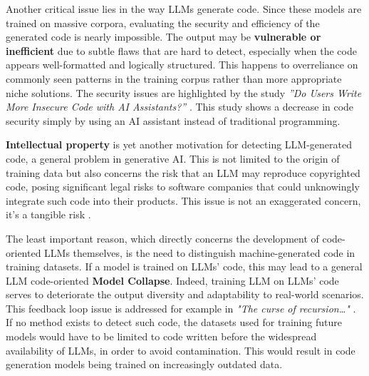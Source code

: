 \vspace{1\baselineskip}
\noindent

Another critical issue lies in the way LLMs generate code. 
Since these models are trained on massive corpora, 
evaluating the security and efficiency of the generated 
code is nearly impossible. The output may be 
\textbf{vulnerable or inefficient} 
due to subtle flaws that are hard to detect, especially 
when the code appears well-formatted and logically 
structured. 
This happens to overreliance on 
commonly seen patterns in the training corpus rather 
than more appropriate niche solutions.
The security issues are highlighted by the study
\textit{”Do Users Write More Insecure Code with AI Assistants?”} 
\cite{perry2022users}. This study shows a decrease in
code security simply by using an AI assistant instead of
traditional programming.


\vspace{1\baselineskip}
\noindent

\textbf{Intellectual property} is yet another motivation 
for detecting LLM-generated code, a general problem 
in generative AI. This is not limited to the origin 
of training data but also concerns the risk that an 
LLM may reproduce copyrighted code, posing 
significant legal risks to software companies 
that could unknowingly integrate such code into 
their products.
This issue is not an exaggerated concern, 
it's a tangible risk \cite{DoeVGitHub2024}.


\vspace{1\baselineskip}
\noindent

The least important reason, 
which directly 
concerns the development of code-oriented 
LLMs themselves, is the need to distinguish 
machine-generated code in training datasets. 
If a model is trained on LLMs' code, this may lead to a 
general LLM code-oriented \textbf{Model Collapse}. 
Indeed, training LLM on LLMs' code serves to deteriorate the 
output diversity and adaptability to real-world scenarios.
This feedback loop issue is addressed for example in 
\textit{"The curse of recursion…"} 
\cite{shumailov2023curse}.
If no method exists to detect such code, the 
datasets used for training future models would 
have to be limited to code written before the 
widespread availability of LLMs, in order to 
avoid contamination. This would result in 
code generation models being trained on 
increasingly outdated data. 


